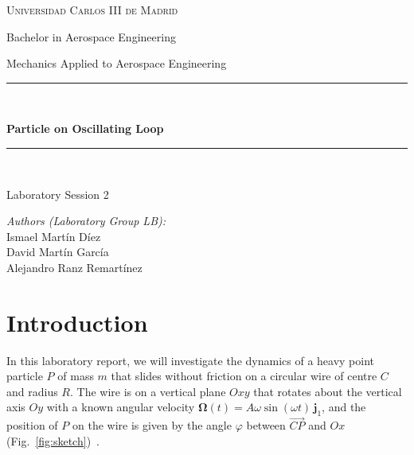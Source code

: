 \documentclass[11pt,a4paper]{article}
\numberwithin{equation}{section}
\newcommand{\jj}{\mathbf{j}_1}
\newcommand{\Om}{\boldsymbol{\Omega}}
\begin{document}
\begin{titlepage}
\centering
\vspace*{3cm}
{\Huge\scshape Universidad Carlos III de Madrid\par}\vspace{0.4cm}
{\large Bachelor in Aerospace Engineering\par}\vspace{1.2cm}
{\Large Mechanics Applied to Aerospace Engineering\par}\vspace{0.8cm}
\rule{\linewidth}{1.2pt}\\[0.3cm]
{\LARGE\bfseries Particle on Oscillating Loop\par}\vspace{0.3cm}
\rule{\linewidth}{1.2pt}\\[0.8cm]
{\large Laboratory Session 2\par}\vspace{1.2cm}
\begin{flushleft}
\hspace{1.2cm}\textit{Authors (Laboratory Group LB):}\\
\hspace{1.2cm}Ismael Mart\'in D\'iez\\
\hspace{1.2cm}David Mart\'in Garc\'ia\\
\hspace{1.2cm}Alejandro Ranz Remart\'inez
\end{flushleft}
\vfill
\end{titlepage}

\setlength{\abovedisplayskip}{5pt plus 1pt minus 1pt}
\setlength{\belowdisplayskip}{5pt plus 1pt minus 1pt}
\setlength{\abovedisplayshortskip}{2pt plus 1pt minus 1pt}
\setlength{\belowdisplayshortskip}{3pt plus 1pt minus 1pt}


\section{Introduction}
In this laboratory report, we will investigate the dynamics of a heavy point particle $P$ of mass $m$ that slides without friction on a circular wire of centre $C$ and radius $R$. The wire is on a vertical plane $Oxy$ that rotates about the vertical axis $Oy$ with a known angular velocity $\Om(t)=A\omega\sin(\omega t)\,\jj$, and the position of $P$ on the wire is given by the angle $\varphi$ between $\overrightarrow{CP}$ and $Ox$ (Fig.~\ref{fig:sketch})~\cite{slides}.
\end{document}
